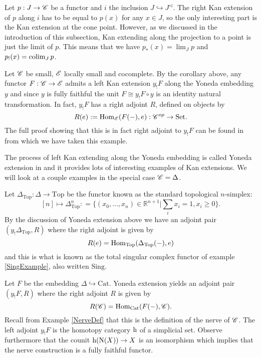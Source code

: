 \documentclass[../../thesis.tex]{subfiles}
\begin{document}
\begin{example}\label{KanCone}
    Let $ p : J \to \mathscr{C}$ be a functor and $i$ the inclusion $J \hookrightarrow J^{\triangleleft}$.
    The right Kan extension of $p$ along $i$ has to be equal to $p(x)$ for any $x \in J$, so the only interesting part is the Kan extension at the cone point.
    However, as we discussed in the introduction of this subsection, Kan extending along the projection to a point is just the limit of $p$.
    This means that we have $p_*(x) = \lim_J p$ and $p_!(x) = \operatorname{colim}_J p $.
\end{example}
\begin{example}
    Let $\mathscr{C}$ be small, $\mathscr{E}$ locally small and cocomplete.
    By the corollary above, any functor $F: \mathscr{C} \to \mathscr{E}$ admits a left Kan extension $y_!F$ along the Yoneda embedding $y$ and since $y$ is fully faithful the unit $F \cong y_!F\circ y$ is an identity natural transformation.
    In fact, $y_!F$ has a right adjoint $R$, defined on objects by
    \[
        R(e) : = \mathrm{Hom}_{\mathscr{E}}(F({-}), e) : \mathscr{C}^{op} \to \mathrm{Set}.
    \]
    The full proof showing that this is in fact right adjoint to $y_!F$ can be found in \cite[Remark 6.5.9.]{CatContext} from which we have taken this example.
\end{example}
The process of left Kan extending along the Yoneda embedding is called Yoneda extension in \cite[pp.62-64]{CatsSheaves} and it provides lots of interesting examples of Kan extensions.
We will look at a couple examples in the special case $\mathscr{C} = \Delta$.
\begin{example}
    Let $\Delta_{\mathrm{Top}} : \Delta \to \mathrm{Top}$ be the functor known as the standard topological $n$-simplex:
    \[
        [n] \mapsto \Delta^n_{\mathrm{Top}} : = \{(x_0, \dots , x_n) \in \mathbb{R}^{n+1} | \sum_{i}x_i = 1, x_i \geq 0\}  .
    \]
    By the discussion of Yoneda extension above we have an adjoint pair $(y_!\Delta_{\mathrm{Top}}, R)$ where the right adjoint is given by
    \[
        R(e) = \mathrm{Hom}_{\mathrm{Top}}(\Delta_{\mathrm{Top}}({-}), e)
    \]
    and this is what is known as the total singular complex functor of example \ref{SingExample}, also written $\mathrm{Sing}$.
\end{example}
\begin{example}\label{NerveKan}
    Let $F$ be the embedding $\Delta \hookrightarrow \mathrm{Cat}$.
    Yoneda extension yields an adjoint pair $(y_!F, R)$ where the right adjoint $R$ is given by
    \[
        R(\mathscr{C}) = \mathrm{Hom}_{\mathrm{Cat}}(F({-}), \mathscr{C}).
    \]
    Recall from Example \ref{NerveDef} that this is the definition of the nerve of $\mathscr{C}$.
    The left adjoint $y_!F$ is the homotopy category $\mathrm{h}$ of a simplicial set.
    Observe furthermore that the counit $\mathrm{h}(\mathrm{N}(X)) \to X$ is an isomorphism which implies that the nerve construction is a fully faithful functor.
\end{example}
\end{document}
